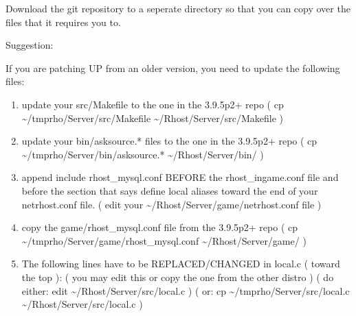 \documentclass[letterpaper,10pt,english]{sphinxmanual}
\begin{document}
\sphinxAtStartPar
Download the git repository to a seperate directory so that you can
copy over the files that it requires you to.

\sphinxAtStartPar
Suggestion:

\begin{sphinxVerbatim}[commandchars=\\\{\}]
   
\end{sphinxVerbatim}

\sphinxAtStartPar
If you are patching UP from an older version, you need to update
the following files:
\begin{enumerate}
%
\item {} 
\sphinxAtStartPar
update your src/Makefile to the one in the 3.9.5p2+ repo
( cp \textasciitilde{}/tmprho/Server/src/Makefile \textasciitilde{}/Rhost/Server/src/Makefile )

\item {} 
\sphinxAtStartPar
update your bin/asksource.* files to the one in the 3.9.5p2+ repo
( cp \textasciitilde{}/tmprho/Server/bin/asksource.* \textasciitilde{}/Rhost/Server/bin/ )

\item {} 
\sphinxAtStartPar
append \textquotesingle{}include rhost\_mysql.conf\textquotesingle{} BEFORE the rhost\_ingame.conf file
and before the section that says \textquotesingle{}define local aliases\textquotesingle{} toward the end of
your netrhost.conf file.
( edit your \textasciitilde{}/Rhost/Server/game/netrhost.conf file )

\item {} 
\sphinxAtStartPar
copy the game/rhost\_mysql.conf file from the 3.9.5p2+ repo
( cp \textasciitilde{}/tmprho/Server/game/rhost\_mysql.conf \textasciitilde{}/Rhost/Server/game/ )

\item {} 
\sphinxAtStartPar
The following lines have to be REPLACED/CHANGED in local.c ( toward the top ):
( you may edit this or copy the one from the other distro )
( do either:  edit \textasciitilde{}/Rhost/Server/src/local.c )
(        or:  cp \textasciitilde{}/tmprho/Server/src/local.c \textasciitilde{}/Rhost/Server/src/local.c )

\end{enumerate}
\end{document}
